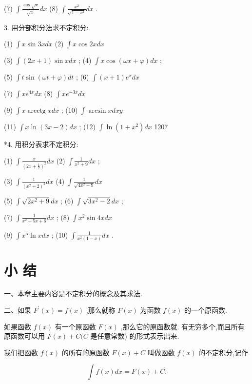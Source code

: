 \documentclass[10pt]{article}
\begin{document}
(7) \(\int \frac{\cos \sqrt{x}}{\sqrt{x}}{dx}\) (8) \(\int \frac{{x}^{2}}{\sqrt{1 - {x}^{2}}}{dx}\) .

3. 用分部积分法求不定积分:

(1) \(\int x\sin {3xdx}\) (2) \(\int x\cos {2xdx}\)

(3) \(\int \left( {{2x} + 1}\right) \sin {xdx}\) ; (4) \(\int x\cos \left( {{\omega x} + \varphi }\right) {dx}\) ;

(5) \(\int t\sin \left( {{\omega t} + \varphi }\right) {dt}\) ; (6) \(\int \left( {x + 1}\right) {e}^{x}{dx}\)

(7) \(\int x{e}^{4x}{dx}\) (8) \(\int x{e}^{-{3x}}{dx}\)

(9) \(\int x\operatorname{arcctg}{xdx}\) ; (10) \(\int \arcsin {xdxy}\)

(11) \(\int x\ln \left( {{3x} - 2}\right) {dx}\) ; (12) \(\int \ln \left( {1 + {x}^{2}}\right) {dx}\) 1207

*4. 用积分表求不定积分:

(1) \(\int \frac{x}{{\left( 2x + \frac{1}{2}\right) }^{2}}{dx}\) (2) \(\int \frac{1}{{x}^{2} + 9}{dx}\) ;

(3) \(\int \frac{1}{{\left( {x}^{2} + 2\right) }^{2}}{dx}\) (4) \(\int \frac{1}{\sqrt{4{x}^{2} - 9}}{dx}\)

(5) \(\int \sqrt{2{x}^{2} + 9}{dx}\) ; (6) \(\int \sqrt{3{x}^{2} - 2}{dx}\) ;

(7) \(\int \frac{1}{{x}^{2} + {5x} + 6}{dx}\) ; (8) \(\int {x}^{2}\sin {4xdx}\)

(9) \(\int {x}^{5}\ln {xdx}\) ; (10) \(\int \frac{1}{{x}^{2}\left( {1 - x}\right) }{dx}\) .

\section*{小 结}

一、本章主要内容是不定积分的概念及其求法.

二、如果 \({F}^{\prime }\left( x\right) = f\left( x\right)\) ,那么就称 \(F\left( x\right)\) 为函数 \(f\left( x\right)\) 的一个原函数.

如果函数 \(f\left( x\right)\) 有一个原函数 \(F\left( x\right)\) ,那么它的原函数就. 有无穷多个,而且所有原函数可以用 \(F\left( x\right) + C(C\) 是任意常数) 的形式表示出来.

我们把函数 \(f\left( x\right)\) 的所有的原函数 \(F\left( x\right) + C\) 叫做函数 \(f\left( x\right)\) 的不定积分,记作

\[
\int f\left( x\right) {dx} = F\left( x\right) + C.
\]
\end{document}
